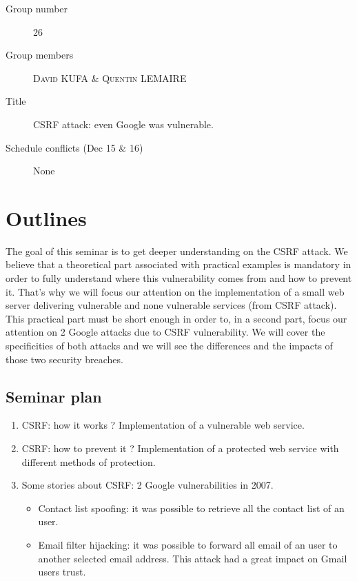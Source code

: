 \documentclass[a4paper,11pt]{article}
\begin{document}
  \begin{description}
   \item[Group number] 26
   \item[Group members] \textsc{David KUFA} \& \textsc{Quentin LEMAIRE}
   \item[Title] CSRF attack: even Google was vulnerable.
   \item[Schedule conflicts (Dec 15 \& 16)] None
  \end{description}

  \section{Outlines}
  
  
  
  The goal of this seminar is to get deeper understanding on the CSRF attack. We believe 
  that a theoretical part associated with practical examples is mandatory in order to fully understand 
  where this vulnerability comes from and how to prevent it. That's why we will focus our attention 
  on the implementation of a small web server delivering vulnerable and none vulnerable 
  services (from CSRF attack). This practical part must be short enough in order to, in a second part, focus our 
  attention on 2 Google attacks due to CSRF vulnerability. We will cover the specificities 
  of both attacks and we will see the differences and the impacts of those two security 
  breaches.
  
  \subsection{Seminar plan}
  
  \begin{enumerate}
   \item CSRF: how it works ? Implementation of a vulnerable web service.
   \item CSRF: how to prevent it ? Implementation of a protected web service with different methods of protection.
   \item Some stories about CSRF: 2 Google vulnerabilities in 2007.
   \begin{itemize}
    \item Contact list spoofing: it was possible to retrieve all the contact list of an user.
    \item Email filter hijacking: it was possible to forward all email of an user to another selected email address. This attack had a great impact on Gmail users trust.
   \end{itemize}
  \end{enumerate}
  
\end{document}
